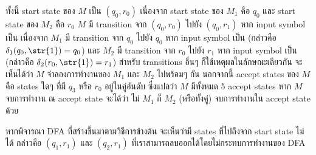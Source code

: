 \begin{example}
\begin{center}
\end{center}
ทั้งนี้ start state ของ $M$ เป็น $(q_0,r_0)$ เนื่องจาก start state ของ $M_1$ คือ $q_0$ และ start state ของ $M_2$ คือ $r_0$ \enskip $M$ มี transition จาก $(q_0,r_0)$ ไปยัง $(q_0,r_1)$ หาก input symbol เป็น  เนื่องจาก $M_1$ มี transition จาก $q_0$ ไปยัง $q_0$ หาก input symbol เป็น  (กล่าวคือ $\delta_1(q_0,\str{1})=q_0$) และ $M_2$ มี transition จาก $r_0$ ไปยัง $r_1$ หาก input symbol เป็น  (กล่าวคือ $\delta_2(r_0,\str{1})=r_1$) \enskip สำหรับ transitions อื่นๆ ก็ใช้เหตุผลในลักษณะเดียวกัน \enskip จะเห็นได้ว่า $M$ จำลองการทำงานของ $M_1$ และ $M_2$ ไปพร้อมๆ กัน \enskip นอกจากนี้ accept states ของ $M$ คือ states ใดๆ ที่มี $q_3$ หรือ $r_0$ อยู่ในคู่อันดับ ซึ่งแปลว่า $M$ มีทั้งหมด 5 accept states \enskip หาก $M$ จบการทำงาน ณ accept state จะได้ว่า ไม่ $M_1$ ก็ $M_2$ (หรือทั้งคู่) จบการทำงานใน accept state ด้วย

หากพิจารณา DFA ที่สร้างขึ้นมาตามวิธีการข้างต้น จะเห็นว่ามี states ที่ไปถึงจาก start state ไม่ได้ กล่าวคือ $(q_1,r_1)$ และ $(q_2,r_1)$ ที่เราสามารถลบออกได้โดยไม่กระทบการทำงานของ DFA
\begin{center}
\end{center}
\end{example}
